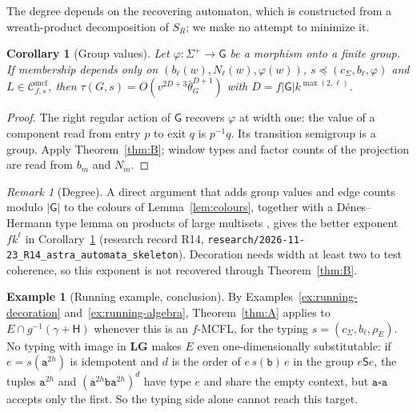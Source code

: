 \documentclass[11pt]{article}
\numberwithin{equation}{section}
\theoremstyle{plain}
\newtheorem{corollary}[theorem]{Corollary}
\theoremstyle{definition}
\newtheorem{example}[theorem]{Example}
\theoremstyle{remark}
\newtheorem{remark}[theorem]{Remark}
\theoremstyle{plain}
\newcommand{\Cmcf}[2]{\mathcal{C}^{\mathrm{mcf}}_{#1,#2}}
\newcommand{\blank}{\square}
\newcommand{\LG}{\mathbf{LG}}
\newcommand{\bth}{\bar\theta}
\begin{document}
The degree depends on the recovering automaton, which is constructed from a
wreath-product decomposition of $S_R$; we make no attempt to minimize it.

\begin{corollary}[Group values]
\label{cor:group}
Let $\varphi:\Sigma^+\to\mathsf G$ be a morphism onto a finite group.  If
membership depends only on $(b_\ell(w),N_\ell(w),\varphi(w))$,
$s\preceq(c_\Sigma,b_\ell,\varphi)$ and $L\in\Cmcf{f}{s}$, then
$\tau(G,s)=O(v^{2D+3}\bth_G^{D+1})$ with $D=f|\mathsf G|k^{\max(2,\ell)}$.
\end{corollary}

\begin{proof}
The right regular action of $\mathsf G$ recovers $\varphi$ at width one: the
value of a component read from entry $p$ to exit $q$ is $p^{-1}q$.  Its
transition semigroup is a group.  Apply Theorem~\ref{thm:B}; window types and
factor counts of the projection are read from $b_m$ and $N_m$.
\end{proof}

\begin{remark}[Degree]
\label{rem:degree}
A direct argument that adds group values and edge counts modulo $|\mathsf G|$ to the
colours of Lemma~\ref{lem:colours}, together with a Dénes--Hermann type lemma on
products of large multisets \cite{DenesHermann1982}, gives the better exponent
$fk^\ell$ in Corollary~\ref{cor:group}
(research record R14, \texttt{research/2026-11-23\_R14\_astra\_automata\_skeleton}).
Decoration needs width at least two to test coherence, so this exponent is not
recovered through Theorem~\ref{thm:B}.
\end{remark}

\begin{example}[Running example, conclusion]
\label{ex:even-runs}
By Examples~\ref{ex:running-decoration} and~\ref{ex:running-algebra},
Theorem~\ref{thm:A} applies to $E\cap g^{-1}(\gamma+\mathsf H)$ whenever this is
an $f$-MCFL, for the typing $s=(c_\Sigma,b_\ell,\rho_E)$.  No typing with image in
$\LG$ makes $E$ even one-dimensionally substitutable: if $e=s(\mathtt a^{2h})$ is
idempotent and $d$ is the order of $e\,s(\mathtt b)\,e$ in the group
$e\mathsf Se$, the tuples $\mathtt a^{2h}$ and $(\mathtt a^{2h}\mathtt b\mathtt
a^{2h})^d$ have type $e$ and share the empty context, but $\mathtt a\blank\mathtt
a$ accepts only the first.  So the typing side alone cannot reach this target.
\end{example}
\end{document}
